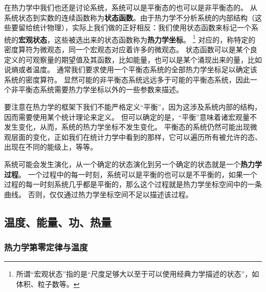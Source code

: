\documentclass[hyperref, UTF8, a4paper]{ctexart}
\begin{document}
在热力学中我们也还是讨论系统，系统可以是平衡态的也可以是非平衡态的。
从系统状态到实数的连续函数称为\textbf{状态函数}。由于热力学不分析系统的内部结构（这些要留给统计物理），实际上我们做的正好相反：我们使用状态函数来标记一个系统的\textbf{宏观状态}，这些被选出来的状态函数称为\textbf{热力学坐标}。%
\footnote{所谓“宏观状态”指的是“尺度足够大以至于可以使用经典力学描述的状态”，如体积、粒子数等。}%
对应的，称特定的密度算符为微观态，同一个宏观态对应着许多的微观态。
状态函数可以是某个良定义的可观察量的期望值及其函数，比如能量，也可以是某个涌现出来的量，比如说熵或者温度。
通常我们要求使用一个平衡态系统的全部热力学坐标足以确定该系统的密度算符。
显然可能的非平衡态系统远远多于可能的平衡态系统，因此一个非平衡态系统需要热力学坐标以外的一些参数来描述。

要注意在热力学的框架下我们不能严格定义“平衡”，因为这涉及系统内部的结构，因而需要使用某个统计理论来定义。
但可以确定的是，“平衡”意味着诸宏观量不发生变化，从而，系统的热力学坐标不发生变化。
平衡态的系统仍然可能出现微观层面的变化，正如我们在统计力学中看到的那样，它可以遍历所有被允许的态、出现在不同的能级上，等等。

系统可能会发生演化，从一个确定的状态演化到另一个确定的状态就是一个\textbf{热力学过程}。
一个过程中的每一时刻，系统可以是平衡的也可以是不平衡的，如果一个过程的每一时刻系统几乎都是平衡的，那么这个过程就是热力学坐标空间中的一条曲线。
否则，仅仅通过热力学坐标空间不足以描述该过程。

\subsection{温度、能量、功、热量}

\subsubsection{热力学第零定律与温度}
\end{document}

